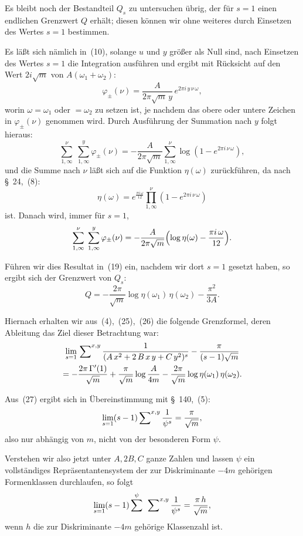\documentclass[12pt,a4paper]{article}
\theoremstyle{definition}
\begin{document}
Es bleibt noch der Bestandteil $Q_{s}$ zu untersuchen übrig, der für $s=1$ 
einen endlichen Grenzwert $Q$ erhält; diesen können wir ohne weiteres durch 
Einsetzen des Wertes $s = 1$ bestimmen.

Es läßt sich nämlich in~(10), solange $u$ und $y$ größer als Null sind, 
nach Einsetzen des Wertes $s = 1$ die Integration ausführen und ergibt mit 
Rücksicht auf den Wert $2i\sqrt{m}$ von $A(\omega_{1}+\omega_{2})$:
\[
\varphi_{\pm}(\nu) = \frac{A}{2\pi\sqrt{m}\,y}
\,e^{2\pi i\,y\,\nu\,\omega},
\]
worin $\omega = \omega_{1}$ oder $= \omega_{2}$ zu setzen ist, je nachdem 
das obere oder untere Zeichen in $\varphi_{\pm}(\nu)$ genommen wird. Durch 
Ausführung der Summation nach $y$ folgt hieraus:
\[
\sum_{1,\infty}^{\nu}\;\sum_{1,\infty}^{y} \varphi_{\pm}(\nu) =
-\frac{A}{2\pi\sqrt{m}} \sum_{1,\infty}^{\nu}
\log(1 - e^{2\pi i\,\nu\,\omega}),
\]
und die Summe nach $\nu$ läßt sich auf die Funktion $\eta(\omega)$ 
zurückführen, da nach \S~24,~(8):
\[
\eta(\omega) = e^{\frac{\pi i\,\omega}{12}}
\prod_{1,\infty}^{\nu}(1 - e^{2\pi i\,\nu\,\omega})
\]
ist. Danach wird, immer für $s = 1$,
\[
\sum_{1,\infty}^{\nu}\;\sum_{1,\infty}^{y} \varphi_{\pm}(\nu) =
-\frac{A}{2\pi\sqrt{m}}\Bigl(\log\eta(\omega) - \frac{\pi i\,\omega}{12}\Bigr).
\]

Führen wir dies Resultat in~(19) ein, nachdem wir dort $s = 1$ gesetzt 
haben, so ergibt sich der Grenzwert von $Q_{s}$:
\begin{equation}
Q = -\frac{2\pi}{\sqrt{m}}\log\eta(\omega_{1})\,\eta(\omega_{2}) - \frac{\pi^{2}}{3A}.
\end{equation}

Hiernach erhalten wir aus~(4),~(25),~(26) die folgende Grenzformel, deren 
Ableitung das Ziel dieser Betrachtung war:
\begin{multline}
\lim_{s=1}\sideset{}{^{x,y}}\sum
\frac{1}{(A\,x^{2} + 2\,B\,x\,y + C\,y^{2})^{s}}
- \frac{\pi}{(s-1)\sqrt{m}}\\
= -\frac{2\pi\,\Gamma'(1)}{\sqrt{m}} + \frac{\pi}{\sqrt{m}}\log\frac{A}{4m}
- \frac{2\pi}{\sqrt{m}}\log\eta(\omega_{1})\,\eta(\omega_{2}).
\end{multline}

Aus~(27) ergibt sich in Übereinstimmung mit \S~140,~(5):
\[
\lim_{s=1} (s-1)\sideset{}{^{x,y}}\sum\frac{1}{\psi^{s}} = \frac{\pi}{\sqrt{m}},
\]
also nur abhängig von $m$, nicht von der besonderen Form $\psi$.

Verstehen wir also jetzt unter $A, 2B, C$ ganze Zahlen und lassen $\psi$ ein 
vollständiges Repräsentantensystem der zur Diskriminante $-4m$ gehörigen 
Formenklassen durchlaufen, so folgt
\begin{equation}
\lim_{s=1} (s-1) \sum^{\psi}\;\sideset{}{^{x,y}}\sum\frac{1}{\psi^{s}}
= \frac{\pi\,h}{\sqrt{m}},
\end{equation}
wenn $h$ die zur Diskriminante $-4m$ gehörige Klassenzahl ist.
\end{document}
